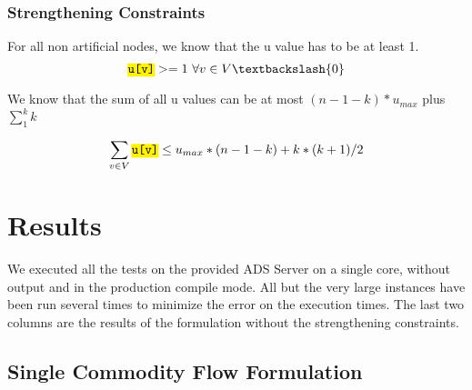 \documentclass[,%
			paper=a4,%
			DIV14,
			liststotoc,
			bibtotoc,
			draft=false,%
			numbers=noendperiod
			]{scrartcl}
\newcommand{\ilc}[1]{\hl{\texttt{#1}}} %
\begin{document}
\subsubsection{Strengthening Constraints}
For all non artificial nodes, we know that the u value has to be at least 1.
\begin{equation}\label{eq:mztNodes1}
 \ilc{u[v]} >= 1
 \ \forall v \in V  \textbackslash \{0\}
\end{equation}

We know that the sum of all u values can be at most $(n-1 - k) * u_{max}$ plus $\sum_1^k{k}$

\begin{equation}\label{eq:mztMaxU}
\sum_{v \in V}{\ilc{u[v]}} \leq u_{max} * ( n - 1 - k ) + {k * (k+1)} / 2
\end{equation}


\section{Results}
We executed all the tests on the provided ADS Server on a single core, without output and in the production compile mode. All but the very large instances have been run several times to minimize the error on the execution times. The last two columns are the results of the formulation without the strengthening constraints.


\subsection{Single Commodity Flow Formulation}
\end{document}
